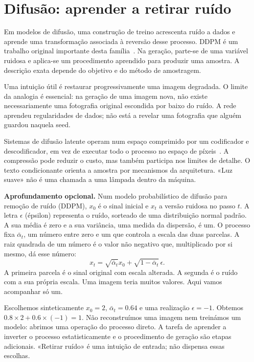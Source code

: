 \section{Difusão: aprender a retirar ruído}
Em modelos de difusão, uma construção de treino acrescenta ruído a dados e aprende uma transformação associada à reversão desse processo. DDPM é um trabalho original importante desta família~\citep{ho2020}. Na geração, parte-se de uma variável ruidosa e aplica-se um procedimento aprendido para produzir uma amostra. A descrição exata depende do objetivo e do método de amostragem.

Uma intuição útil é restaurar progressivamente uma imagem degradada. O limite da analogia é essencial: na geração de uma imagem nova, não existe necessariamente uma fotografia original escondida por baixo do ruído. A rede aprendeu regularidades de dados; não está a revelar uma fotografia que alguém guardou naquela seed.

Sistemas de difusão latente operam num espaço comprimido por um codificador e descodificador, em vez de executar todo o processo no espaço de píxeis~\citep{rombach2022}. A compressão pode reduzir o custo, mas também participa nos limites de detalhe. O texto condicionante orienta a amostra por mecanismos da arquitetura. «Luz suave» não é uma chamada a uma lâmpada dentro da máquina.

\textbf{Aprofundamento opcional.} Num modelo probabilístico de difusão para remoção de ruído (DDPM), $x_0$ é o sinal inicial e $x_t$ a versão ruidosa no passo $t$. A letra $\epsilon$ (épsilon) representa o ruído, sorteado de uma distribuição normal padrão. A sua média é zero e a sua variância, uma medida da dispersão, é um. O processo fixa $\bar\alpha_t$, um número entre zero e um que controla a escala das duas parcelas. A raiz quadrada de um número é o valor não negativo que, multiplicado por si mesmo, dá esse número:
\[
x_t=\sqrt{\bar\alpha_t}x_0+\sqrt{1-\bar\alpha_t}\,\epsilon.
\]
A primeira parcela é o sinal original com escala alterada. A segunda é o ruído com a sua própria escala. Uma imagem teria muitos valores. Aqui vamos acompanhar só um.

Escolhemos sinteticamente $x_0=2$, $\bar\alpha_t=0.64$ e uma realização $\epsilon=-1$. Obtemos $0.8\times2+0.6\times(-1)=1$. Não reconstruímos uma imagem nem treinámos um modelo: abrimos uma operação do processo direto. A tarefa de aprender a inverter o processo estatisticamente e o procedimento de geração são etapas adicionais. «Retirar ruído» é uma intuição de entrada; não dispensa essas escolhas.

